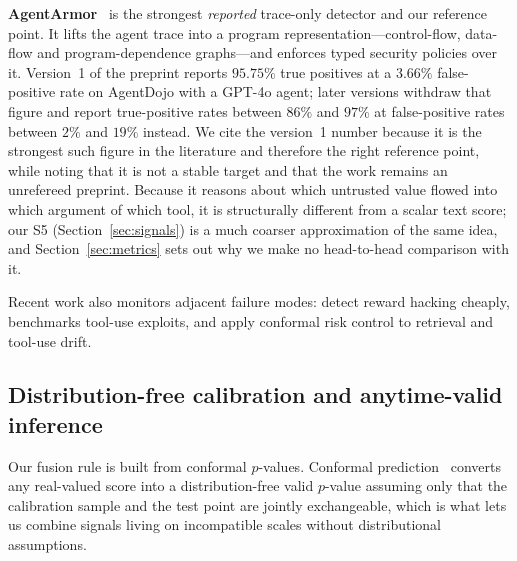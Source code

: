 \documentclass[preprint,12pt,authoryear]{elsarticle}
\theoremstyle{definition}
\begin{document}
\textbf{AgentArmor}~\citep{wang2025agentarmor} is the strongest \emph{reported}
trace-only detector and our reference point. It lifts the agent trace into a
program representation---control-flow, data-flow and program-dependence
graphs---and enforces typed security policies over it. Version~1 of the preprint
reports $95.75\%$ true positives at a $3.66\%$ false-positive rate on AgentDojo
with a GPT-4o agent; later versions withdraw that figure and report true-positive
rates between $86\%$ and $97\%$ at false-positive rates between $2\%$ and $19\%$
instead. We cite the version~1 number because it is the strongest such figure in
the literature and therefore the right reference point, while noting that it is
not a stable target and that the work remains an unrefereed preprint. Because it
reasons about which untrusted value flowed into which argument of which tool, it is
structurally different from a scalar text score; our S5 (Section~\ref{sec:signals})
is a much coarser approximation of the same idea, and Section~\ref{sec:metrics}
sets out why we make no head-to-head comparison with it.

Recent work also monitors adjacent failure modes: \citet{belenky2026cheap} detect
reward hacking cheaply, \citet{thaman2026rewardhacking} benchmarks tool-use
exploits, and \citet{opoku2026toolchain} apply conformal risk control to
retrieval and tool-use drift.

\subsection{Distribution-free calibration and anytime-valid inference}

Our fusion rule is built from conformal $p$-values. Conformal
prediction~\citep{vovk2022algorithmic} converts any real-valued score into a
distribution-free valid $p$-value assuming only that the calibration sample and
the test point are jointly exchangeable, which is what lets us combine signals living on incompatible scales
without distributional assumptions.
\end{document}
